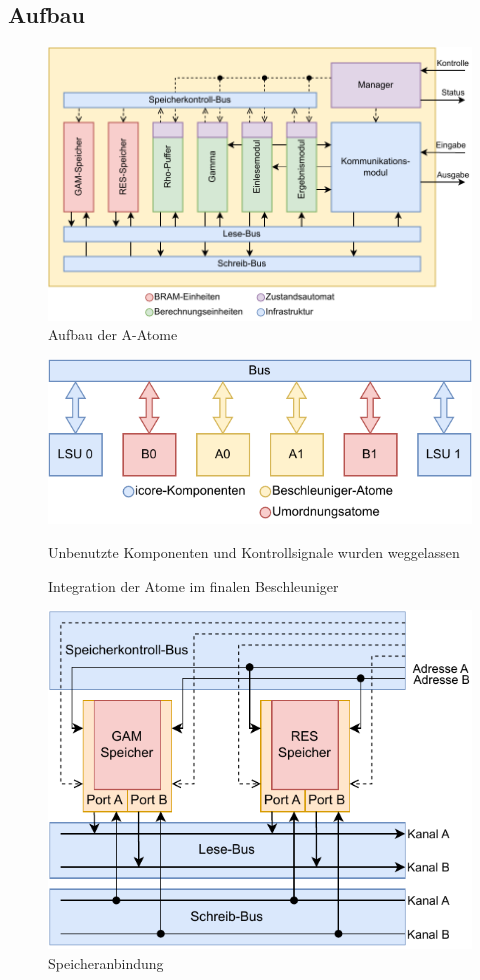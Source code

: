 \subsection{Aufbau}
\begin{figure}
	\center
	\includegraphics{images/iteration_3.pdf}
	\caption{Aufbau der A-Atome}
	\label{fig:aufbau_iteration_3}
\end{figure}
\begin{figure}
	\center
    \includegraphics{images/Iteration_3_Integration.pdf}
	\caption{Integration der Atome im finalen Beschleuniger}
    Unbenutzte Komponenten und Kontrollsignale wurden weggelassen
	\label{fig:iteration_3_integration}
\end{figure}
\begin{figure}
	\center
	\includegraphics{images/Speicheranbindung.pdf}
	\caption{Speicheranbindung}
	\label{fig:speicheranbindung_iteration_3}
\end{figure}

